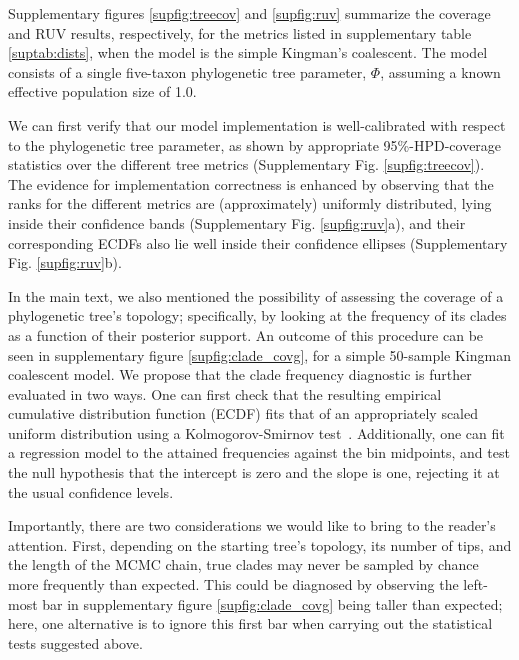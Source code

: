 \documentclass[oneside]{article}
\begin{document}
Supplementary figures \ref{supfig:treecov} and \ref{supfig:ruv} summarize the coverage and RUV results, respectively, for the metrics listed in supplementary table \ref{suptab:dists}, when the model is the simple Kingman's coalescent.
The model consists of a single five-taxon phylogenetic tree parameter, $\Phi$, assuming a known effective population size of 1.0.

We can first verify that our model implementation is well-calibrated with respect to the phylogenetic tree parameter, as shown by appropriate 95\%-HPD-coverage statistics over the different tree metrics (Supplementary Fig. \ref{supfig:treecov}).
The evidence for implementation correctness is enhanced by observing that the ranks for the different metrics are (approximately) uniformly distributed, lying inside their confidence bands (Supplementary Fig. \ref{supfig:ruv}a), and their corresponding ECDFs also lie well inside their confidence ellipses (Supplementary Fig. \ref{supfig:ruv}b).

In the main text, we also mentioned the possibility of assessing the coverage of a phylogenetic tree's topology; specifically, by looking at the frequency of its clades as a function of their posterior support.
An outcome of this procedure can be seen in supplementary figure \ref{supfig:clade_covg}, for a simple 50-sample Kingman coalescent model.
We propose that the clade frequency diagnostic is further evaluated in two ways.
One can first check that the resulting empirical cumulative distribution function (ECDF) fits that of an appropriately scaled uniform distribution using a Kolmogorov-Smirnov test~\citep{Birnbaum1951}.
Additionally, one can fit a regression model to the attained frequencies against the bin midpoints, and test the null hypothesis that the intercept is zero and the slope is one, rejecting it at the usual confidence levels.

Importantly, there are two considerations we would like to bring to the reader's attention.
First, depending on the starting tree's topology, its number of tips, and the length of the MCMC chain, true clades may never be sampled by chance more frequently than expected.
This could be diagnosed by observing the left-most bar in supplementary figure \ref{supfig:clade_covg} being taller than expected; here, one alternative is to ignore this first bar when carrying out the statistical tests suggested above.
\end{document}
